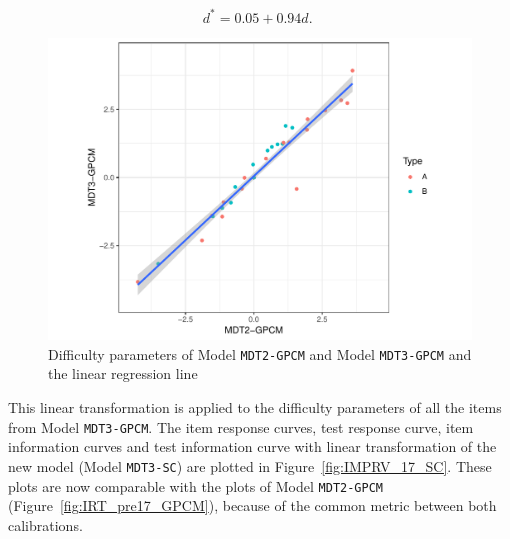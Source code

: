 \documentclass[a4paper]{report}
\begin{document}
$$d^* = 0.05 + 0.94 d \text{. }$$

\begin{figure}[H]
  \centering
  \includegraphics[width=\linewidth]{fig/IMPRV_SC_lm.pdf}
  \caption{\label{fig:IMPRV_SC_lm}Difficulty parameters of Model \texttt{MDT2-GPCM} and Model \texttt{MDT3-GPCM} and the linear regression line}
\end{figure}

This linear transformation is applied to the difficulty parameters of all the items from Model \texttt{MDT3-GPCM}. The item response curves, test response curve, item information curves and test information curve with linear transformation of the new model (Model \texttt{MDT3-SC}) are plotted in Figure~\ref{fig:IMPRV_17_SC}. These plots are now comparable with the plots of Model \texttt{MDT2-GPCM} (Figure~\ref{fig:IRT_pre17_GPCM}), because of the common metric between both calibrations. 
\end{document}
